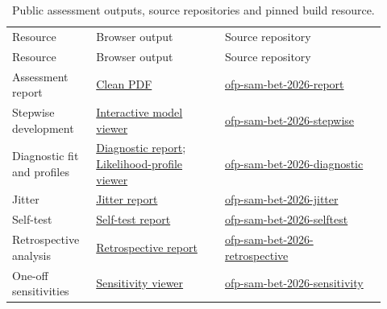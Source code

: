 \documentclass[
  english,
  a4paper,
  a4paper,
  11pt]{SCreport}
\begin{document}
\begin{longtable}{@{}>{\raggedright\arraybackslash}p{0.20\linewidth}>{\raggedright\arraybackslash}p{0.32\linewidth}>{\raggedright\arraybackslash}p{0.40\linewidth}@{}}

\caption{\label{tbl-open-science-resources}Public assessment outputs, source repositories and pinned build resource.}

\tabularnewline

\\
\toprule
Resource & Browser output & Source repository \\
\midrule
\endfirsthead
\toprule
Resource & Browser output & Source repository \\
\midrule
\endhead
\bottomrule
\endlastfoot
Assessment report & \href{https://pacificcommunity.github.io/ofp-sam-bet-2026-report/}{Clean PDF} & \href{https://github.com/PacificCommunity/ofp-sam-bet-2026-report}{ofp-sam-bet-2026-report} \\
Stepwise development & \href{https://pacificcommunity.github.io/ofp-sam-bet-2026-stepwise/interactive-model-viewer.html}{Interactive model viewer} & \href{https://github.com/PacificCommunity/ofp-sam-bet-2026-stepwise}{ofp-sam-bet-2026-stepwise} \\
Diagnostic fit and profiles & \href{https://pacificcommunity.github.io/ofp-sam-bet-2026-diagnostic/bet-2026-diagnostic-report.html}{Diagnostic report}; \href{https://pacificcommunity.github.io/ofp-sam-bet-2026-diagnostic/bet-2026-likelihood-profile-viewer.html}{Likelihood-profile viewer} & \href{https://github.com/PacificCommunity/ofp-sam-bet-2026-diagnostic}{ofp-sam-bet-2026-diagnostic} \\
Jitter & \href{https://pacificcommunity.github.io/ofp-sam-bet-2026-jitter/jitter-report.html}{Jitter report} & \href{https://github.com/PacificCommunity/ofp-sam-bet-2026-jitter}{ofp-sam-bet-2026-jitter} \\
Self-test & \href{https://pacificcommunity.github.io/ofp-sam-bet-2026-selftest/selftest-report.html}{Self-test report} & \href{https://github.com/PacificCommunity/ofp-sam-bet-2026-selftest}{ofp-sam-bet-2026-selftest} \\
Retrospective analysis & \href{https://pacificcommunity.github.io/ofp-sam-bet-2026-retrospective/retrospective-report.html}{Retrospective report} & \href{https://github.com/PacificCommunity/ofp-sam-bet-2026-retrospective}{ofp-sam-bet-2026-retrospective} \\
One-off sensitivities & \href{https://pacificcommunity.github.io/ofp-sam-bet-2026-sensitivity/bet-2026-sensitivity-interactive-viewer.html}{Sensitivity viewer} & \href{https://github.com/PacificCommunity/ofp-sam-bet-2026-sensitivity}{ofp-sam-bet-2026-sensitivity} \\

\end{longtable}
\end{document}
